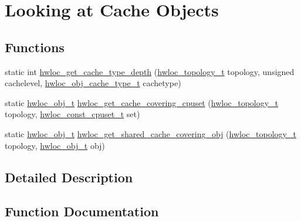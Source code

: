 \hypertarget{a00199}{}\section{Looking at Cache Objects}
\label{a00199}
\subsection*{Functions}
\begin{DoxyCompactItemize}
\item 
static int \hyperlink{a00199_gad108a09ce400222fe45545257d575489}{hwloc\+\_\+get\+\_\+cache\+\_\+type\+\_\+depth} (\hyperlink{a00186_ga9d1e76ee15a7dee158b786c30b6a6e38}{hwloc\+\_\+topology\+\_\+t} topology, unsigned cachelevel, \hyperlink{a00184_gab6e1e7efedae8b341f3ee14fbe53d66c}{hwloc\+\_\+obj\+\_\+cache\+\_\+type\+\_\+t} cachetype)
\item 
static \hyperlink{a00185_ga79b8ab56877ef99ac59b833203391c7d}{hwloc\+\_\+obj\+\_\+t} \hyperlink{a00199_gac4cd480a5deaa4ada047fdd11ae4c070}{hwloc\+\_\+get\+\_\+cache\+\_\+covering\+\_\+cpuset} (\hyperlink{a00186_ga9d1e76ee15a7dee158b786c30b6a6e38}{hwloc\+\_\+topology\+\_\+t} topology, \hyperlink{a00183_ga1f784433e9b606261f62d1134f6a3b25}{hwloc\+\_\+const\+\_\+cpuset\+\_\+t} set)
\item 
static \hyperlink{a00185_ga79b8ab56877ef99ac59b833203391c7d}{hwloc\+\_\+obj\+\_\+t} \hyperlink{a00199_ga36f48c32837c7a70b424706e213dcd71}{hwloc\+\_\+get\+\_\+shared\+\_\+cache\+\_\+covering\+\_\+obj} (\hyperlink{a00186_ga9d1e76ee15a7dee158b786c30b6a6e38}{hwloc\+\_\+topology\+\_\+t} topology, \hyperlink{a00185_ga79b8ab56877ef99ac59b833203391c7d}{hwloc\+\_\+obj\+\_\+t} obj)
\end{DoxyCompactItemize}


\subsection{Detailed Description}


\subsection{Function Documentation}
\mbox{\label{a00199_gac4cd480a5deaa4ada047fdd11ae4c070}} 
